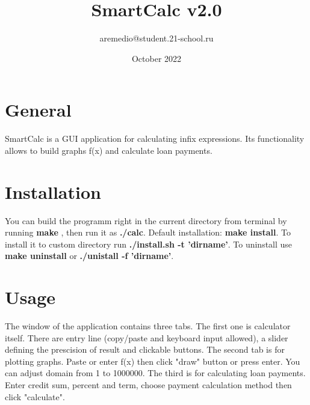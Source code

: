 \documentclass{article}
\title{SmartCalc v2.0}
\author{aremedio@student.21-school.ru}
\date{October 2022}
\begin{document}
\maketitle

\section{General}
SmartCalc is a GUI application for calculating infix expressions. Its functionality allows to build graphs f(x) and calculate loan payments.
\section{Installation}
You can build the programm right in the current directory from terminal by running \textbf{make} , then run it as \textbf{./calc}.
Default installation: \textbf{make install}.
To install it to custom directory run \textbf{./install.sh -t 'dirname'}.
To uninstall use \textbf{make uninstall} or \textbf{./unistall -f 'dirname'}.

\section{Usage}
The window of the application contains three tabs.
The first one is calculator itself. There are entry line (copy/paste and keyboard input allowed), a slider defining the prescision of result and clickable buttons.
The second tab is for plotting graphs. Paste or enter f(x) then click "draw" button or press enter. You can adjust domain from 1 to 1000000.
The third is for calculating loan payments. Enter credit sum, percent and term, choose payment calculation method then click "calculate".
\end{document}
